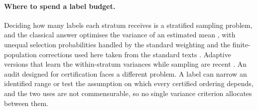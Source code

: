 \paragraph{Where to spend a label budget.}
Deciding how many labels each stratum receives is a stratified sampling problem, and the
classical answer optimises the variance of an estimated mean \citep{neyman1934stratified}, with
unequal selection probabilities handled by the standard weighting
\citep{horvitz1952generalization} and the finite-population corrections used here taken from the
standard texts \citep{cochran1977sampling, kish1965survey}. Adaptive versions that learn the
within-stratum variances while sampling are recent \citep{morikawa2026tsneyman}. An audit designed
for certification faces a different problem. A label can narrow an identified range or test the
assumption on which every certified ordering depends, and the two uses are not commensurable, so
no single variance criterion allocates between them.
